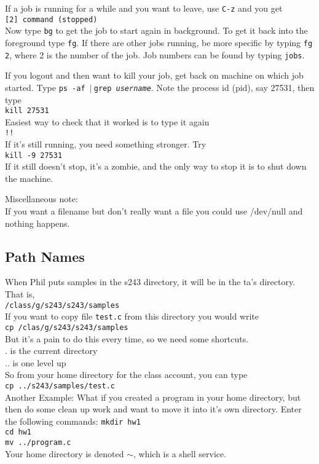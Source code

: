 \documentclass{article}
\newcommand{\pipe}{$|\:$}
\begin{document}
If a job is running for a while and you want to leave, use {\tt C-z} and you get\\
{\tt [2] command (stopped)} \\
Now type {\tt bg} to get the job to start again in background.  To get it back into the foreground
type {\tt fg}.  If there are other jobs running, be more specific by
typing {\tt fg 2}, where 2 is the number of the job.  Job numbers can
be found by typing {\tt jobs}.

If you logout and then want to kill your job, get back on machine on which job
started.  Type {\tt ps -af \pipe grep \emph{ username}}.  
Note the process id (pid), say 27531, then type \\
{\tt kill 27531} \\
Easiest way to check that it worked is to type it again \\
{\tt !!} \\
If it's still running, you need something stronger.  Try \\
{\tt kill -9 27531} \\
If it still doesn't stop, it's a zombie, and the only way to stop it is to shut down the machine.
 
Miscellaneous note: \\
If you want a filename but don't really want a file you could use /dev/null
and nothing happens.

\subsection{Path Names}
\label{sec:pathnames}
When Phil puts samples in the s243 directory, it will be in the ta's directory.  That is, \\
{\tt /class/g/s243/s243/samples} \\
If you want to copy file {\tt test.c} from this directory you would write \\
{\tt cp /clas/g/s243/s243/samples} \\
But it's a pain to do this every time, so we need some shortcuts.\\
. is the current directory \\
.. is one level up \\
So from your home directory for the class account, you can type \\
{\tt cp ../s243/samples/test.c} \\
Another Example: 
What if you created a program in your home directory, but then do some clean up work
and want to move it into it's own directory.  Enter the following commands:
{\tt mkdir hw1} \\
{\tt cd hw1} \\
{\tt mv ../program.c }\\
Your home directory is denoted $\sim$, which is a shell service.
\end{document}

